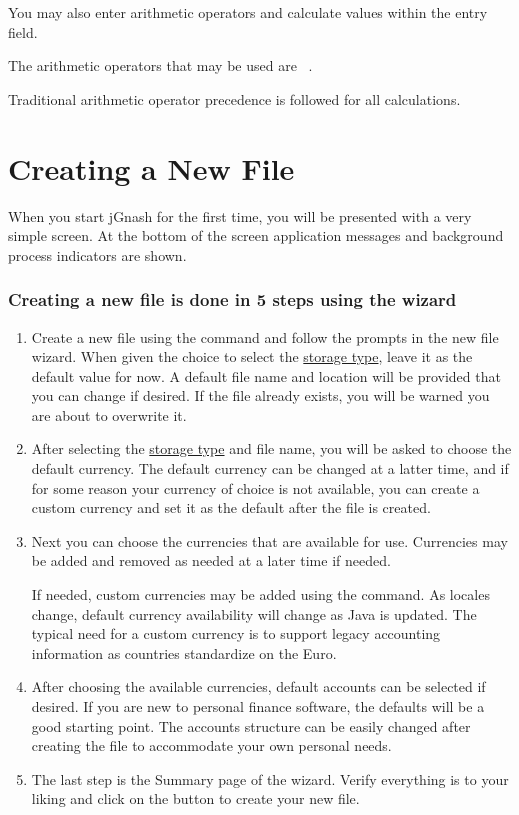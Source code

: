 \documentclass[letterpaper,12pt]{book}
\begin{document}
    You may also enter arithmetic operators and calculate values within the entry field.

    The arithmetic operators that may be used are \keys{(} \keys{)} \keys{{+}} \keys{{-}} \keys{$\star$} \keys{/}  \keys{,}~.

    Traditional arithmetic operator precedence is followed for all calculations.

    \section{Creating a New File}\label{sec:creating-a-new-file}

    When you start jGnash for the first time, you will be presented with a very simple screen.
    At the bottom of the screen application messages and background process indicators are shown.

    \subsubsection*{Creating a new file is done in 5 steps using the wizard}
    \begin{enumerate}
        \item Create a new file using the  command and follow the prompts in the new file wizard.
        When given the choice to select the \hyperref[subsec:fileTypes]{storage type}, leave it as the default value for now.
        A default file name and location will be provided that you can change if desired.
        If the file already exists, you will be warned you are about to overwrite it.
        \item After selecting the \hyperref[subsec:fileTypes]{storage type} and file name, you will be asked to choose
        the default currency.
        The default currency can be changed at a latter time, and if for some reason your currency of choice is not
        available, you can create a custom currency and set it as the default after the file is created.
        \item Next you can choose the currencies that are available for use.
        Currencies may be added and removed as needed at a later time if needed.

        If needed, custom currencies may be added using the  command.
        As locales change, default currency availability will change as Java is updated.
        The typical need for a custom currency is to support legacy accounting information as countries standardize on the Euro.
        \item After choosing the available currencies, default accounts can be selected if desired.
        If you are new to personal finance software, the defaults will be a good starting point.
        The accounts structure can be easily changed after creating the file to accommodate your own personal needs.
        \item The last step is the Summary page of the wizard.
        Verify everything is to your liking and click on the  button to create your new file.
    \end{enumerate}
\end{document}

